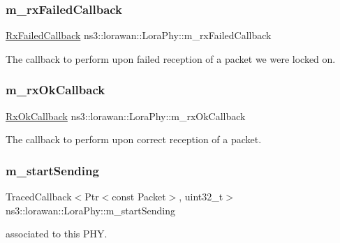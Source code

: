 \subsubsection{\texorpdfstring{m\+\_\+rx\+Failed\+Callback}{m\_rxFailedCallback}}
{\footnotesize\ttfamily \hyperlink{classns3_1_1lorawan_1_1LoraPhy_a2229a4841f407ee9931e563622edf663}{Rx\+Failed\+Callback} ns3\+::lorawan\+::\+Lora\+Phy\+::m\+\_\+rx\+Failed\+Callback\hspace{0.3cm}{\ttfamily [protected]}}

The callback to perform upon failed reception of a packet we were locked on. \mbox{\label{classns3_1_1lorawan_1_1LoraPhy_afaa86274f61442506a553c7d877546f4}} 
\subsubsection{\texorpdfstring{m\+\_\+rx\+Ok\+Callback}{m\_rxOkCallback}}
{\footnotesize\ttfamily \hyperlink{classns3_1_1lorawan_1_1LoraPhy_ae9342f40d4eb2b1f004309f6fb444a50}{Rx\+Ok\+Callback} ns3\+::lorawan\+::\+Lora\+Phy\+::m\+\_\+rx\+Ok\+Callback\hspace{0.3cm}{\ttfamily [protected]}}

The callback to perform upon correct reception of a packet. \mbox{\label{classns3_1_1lorawan_1_1LoraPhy_a7b9de28c406d2f27a73c4b98c810213c}} 
\subsubsection{\texorpdfstring{m\+\_\+start\+Sending}{m\_startSending}}
{\footnotesize\ttfamily Traced\+Callback$<$Ptr$<$const Packet$>$, uint32\+\_\+t$>$ ns3\+::lorawan\+::\+Lora\+Phy\+::m\+\_\+start\+Sending\hspace{0.3cm}{\ttfamily [protected]}}



associated to this P\+HY. 

